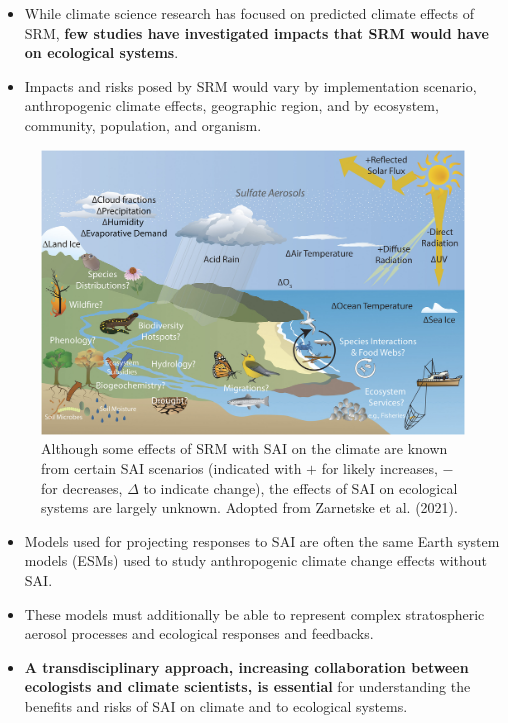 \begin{itemize}
	\item While climate science research has focused on predicted climate effects of SRM, \textbf{few studies have investigated impacts that SRM would have on ecological systems}.
	\item Impacts and risks posed by SRM would vary by implementation scenario, anthropogenic climate effects, geographic region, and by ecosystem, community, population, and organism.

\end{itemize}

\begin{figure}
	\begin{center}
		\includegraphics[width=0.8\columnwidth]{figures/pnas.1921854118fig01.jpg}
	\end{center}
	\caption{Although some effects of SRM with SAI on the climate are known from certain SAI scenarios (indicated with $+$ for likely increases, $-$ for decreases, $\Delta$ to indicate change), the effects of SAI on ecological systems are largely unknown. Adopted from Zarnetske et al. (2021).
	}
\end{figure}

\begin{itemize}
	\item Models used for projecting responses to SAI are often the same Earth system models (ESMs) used to study anthropogenic climate change effects without SAI.
	\item These models must additionally be able to represent complex stratospheric aerosol processes and ecological responses and feedbacks.

	\item \textbf{A transdisciplinary approach, increasing collaboration between ecologists and climate scientists, is essential} for understanding the benefits and risks of SAI on climate and to ecological systems.
\end{itemize}

